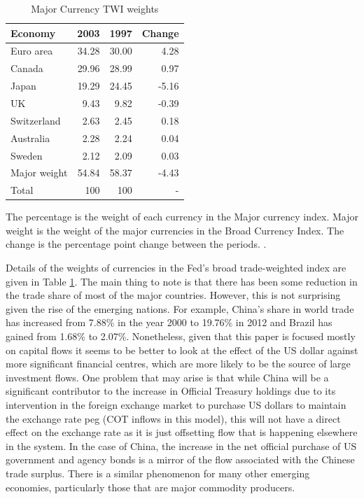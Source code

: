 \documentclass[12pt, a4paper, oneside]{article}\usepackage[]{graphicx}\usepackage[]{color}
\begin{document}
\begin{table}[h!]
\begin{threeparttable}
\caption{Major Currency TWI weights}
\begin{tabular}{l | r r  r}
  \hline
 Economy &  2003 & 1997 & Change \\
  \hline
Euro area & 34.28 & 30.00 & 4.28 \\
Canada & 29.96 & 28.99 &  0.97\\
Japan &  19.29 & 24.45 & -5.16 \\
UK & 9.43 & 9.82& -0.39\\
Switzerland & 2.63 & 2.45& 0.18\\
Australia & 2.28 & 2.24& 0.04\\
Sweden & 2.12 & 2.09 & 0.03\\
Major weight & 54.84 & 58.37 & -4.43\\
\hline
Total & 100 & 100  & - 
\label{tabref:twi}
\end{tabular}
\begin{tablenotes}
\small
\item The percentage is the weight of each currency in the Major currency index.  Major weight is the weight of the major currencies in the Broad Currency Index.   The change is the percentage point change between the periods. \citep{Fedtwi}.   
\end{tablenotes}
\end{threeparttable}
\end{table}

Details of the weights of currencies in the Fed's broad trade-weighted index are given in Table  \ref{tabref:twi}.  The main thing to note is that there has been some reduction in the trade share of most of the major countries.  However, this is not surprising given the rise of the emerging nations.  For example, China's share in world trade has increased from 7.88\% in the year 2000 to 19.76\% in 2012 and Brazil has gained from 1.68\% to 2.07\%.  Nonetheless, given that this paper is focused mostly on capital flows it seems to be better to look at the effect of the US dollar against more significant financial centres, which are more likely to be the source of large investment flows.  One problem that may arise is that while China will be a significant contributor to the increase in Official Treasury holdings due to its intervention in the foreign exchange market to purchase US dollars to maintain the exchange rate peg (COT inflows in this model), this will not have a direct effect on the exchange rate as it is just offsetting flow that is happening elsewhere in the system.  In the case of China, the increase in the net official purchase of US government and agency bonds is a mirror of the flow associated with the Chinese trade surplus.  There is a similar phenomenon for many other emerging economies, particularly those that are major commodity producers.   
 
\end{document}
